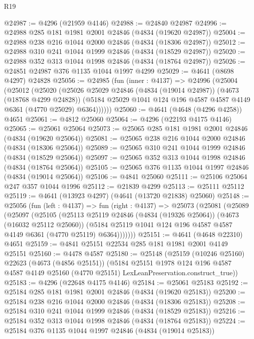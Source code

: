 \begin{lexlean}{R19}
\begin{coremodule}
@24987 := @4296 (@21959 @4146)
@24988 := @24840 @24987
@24996 := @24988 @285 @181 @1981 @2001 @24846 (@4834 (@19620 @24987))
@25004 := @24988 @238 @216 @1044 @2000 @24846 (@4834 (@18306 @24987))
@25012 := @24988 @310 @241 @1044 @1999 @24846 (@4834 (@18529 @24987))
@25020 := @24988 @352 @313 @1044 @1998 @24846 (@4834 (@18764 @24987))
@25026 := @24851 @24987 @376 @1135 @1044 @1997 @4299
@25029 := @4641 (@8698 @4297) @24828
@25056 := @24985
    (fun (inner : @4137) =>
    @24996
      (@25004
        (@25012
          (@25020
            (@25026
              @25029
              @24846
              (@4834 (@19014 @24987))
              (@4673 (@18768 @4299 @24828))
              (@5184 @25029 @1041 @124 @196 @4587 @4587 @4149 @6361 (@4770 @25029) @6364))))))
@25060 := @4641 (@4648 (@4296 @4258)) @4651
@25061 := @4812 @25060
@25064 := @4296 (@22193 @4175 @4146)
@25065 := @25061 @25064
@25073 := @25065 @285 @181 @1981 @2001 @24846 (@4834 (@19620 @25064))
@25081 := @25065 @238 @216 @1044 @2000 @24846 (@4834 (@18306 @25064))
@25089 := @25065 @310 @241 @1044 @1999 @24846 (@4834 (@18529 @25064))
@25097 := @25065 @352 @313 @1044 @1998 @24846 (@4834 (@18764 @25064))
@25105 := @25065 @376 @1135 @1044 @1997 @24846 (@4834 (@19014 @25064))
@25106 := @4841 @25060
@25111 := @25106 @25064 @247 @357 @1044 @1996
@25112 := @21839 @4299
@25113 := @25111 @25112
@25119 := @4641 (@13923 @4297) (@4641 (@13720 @21838) @25060)
@25148 := @25056
    (fun (left : @4137) =>
    fun (right : @4137) =>
    @25073
      (@25081
        (@25089
          (@25097
            (@25105
              (@25113
                @25119
                @24846
                (@4834 (@19326 @25064))
                (@4673 (@16032 @25112 @25060))
                (@5184 @25119 @1041 @124 @196 @4587 @4587 @4149 @6361 (@4770 @25119) @6364)))))))
@25151 := @4641 (@4648 @22310) @4651
@25159 := @4841 @25151 @22534 @285 @181 @1981 @2001 @4149 @25151
@25160 := @4478 @4587
@25180 := @25148
    (@25159
      (@10246 @25160)
      @22623
      (@4673 (@4856 @25151))
      (@5184
        @25151
        @1978
        @124
        @196
        @4587
        @4587
        @4149
        @25160
        (@4770 @25151)
        LexLeanPreservation.construct_true))
@25183 := @4296 (@22648 @4175 @4146)
@25184 := @25061 @25183
@25192 := @25184 @285 @181 @1981 @2001 @24846 (@4834 (@19620 @25183))
@25200 := @25184 @238 @216 @1044 @2000 @24846 (@4834 (@18306 @25183))
@25208 := @25184 @310 @241 @1044 @1999 @24846 (@4834 (@18529 @25183))
@25216 := @25184 @352 @313 @1044 @1998 @24846 (@4834 (@18764 @25183))
@25224 := @25184 @376 @1135 @1044 @1997 @24846 (@4834 (@19014 @25183))

\end{coremodule}
\end{lexlean}
